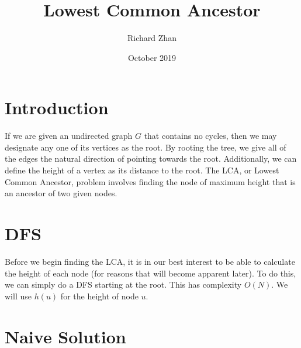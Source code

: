 \documentclass{article}
\title{Lowest Common Ancestor}
\author{Richard Zhan}
\date{October 2019}
\begin{document}
\maketitle

\section{Introduction}
If we are given an undirected graph $G$ that contains no cycles, then we may designate any one of its vertices as the root. By rooting the tree, we give all of the edges the natural direction of pointing towards the root. Additionally, we can define the height of a vertex as its distance to the root. The LCA, or Lowest Common Ancestor, problem involves finding the node of maximum height that is an ancestor of two given nodes.  

\begin{figure}[H]
\centering
{}
\end{figure}


\section{DFS}

Before we begin finding the LCA, it is in our best interest to be able to calculate the height of each node (for reasons that will become apparent later). To do this, we can simply do a DFS starting at the root. This has complexity $O(N)$. We will use $h(u)$ for the height of node $u$.


\section {Naive Solution}
\end{document}
